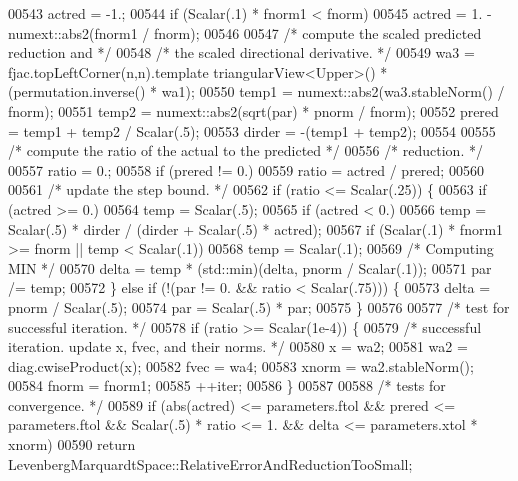 \begin{DoxyCode}
00543         actred = -1.;
00544         \textcolor{keywordflow}{if} (Scalar(.1) * fnorm1 < fnorm)
00545             actred = 1. - numext::abs2(fnorm1 / fnorm);
00546 
00547         \textcolor{comment}{/* compute the scaled predicted reduction and */}
00548         \textcolor{comment}{/* the scaled directional derivative. */}
00549         wa3 = fjac.topLeftCorner(n,n).template triangularView<Upper>() * (permutation.inverse() * wa1);
00550         temp1 = numext::abs2(wa3.stableNorm() / fnorm);
00551         temp2 = numext::abs2(sqrt(par) * pnorm / fnorm);
00552         prered = temp1 + temp2 / Scalar(.5);
00553         dirder = -(temp1 + temp2);
00554 
00555         \textcolor{comment}{/* compute the ratio of the actual to the predicted */}
00556         \textcolor{comment}{/* reduction. */}
00557         ratio = 0.;
00558         \textcolor{keywordflow}{if} (prered != 0.)
00559             ratio = actred / prered;
00560 
00561         \textcolor{comment}{/* update the step bound. */}
00562         \textcolor{keywordflow}{if} (ratio <= Scalar(.25)) \{
00563             \textcolor{keywordflow}{if} (actred >= 0.)
00564                 temp = Scalar(.5);
00565             \textcolor{keywordflow}{if} (actred < 0.)
00566                 temp = Scalar(.5) * dirder / (dirder + Scalar(.5) * actred);
00567             \textcolor{keywordflow}{if} (Scalar(.1) * fnorm1 >= fnorm || temp < Scalar(.1))
00568                 temp = Scalar(.1);
00569             \textcolor{comment}{/* Computing MIN */}
00570             delta = temp * (std::min)(delta, pnorm / Scalar(.1));
00571             par /= temp;
00572         \} \textcolor{keywordflow}{else} \textcolor{keywordflow}{if} (!(par != 0. && ratio < Scalar(.75))) \{
00573             delta = pnorm / Scalar(.5);
00574             par = Scalar(.5) * par;
00575         \}
00576 
00577         \textcolor{comment}{/* test for successful iteration. */}
00578         \textcolor{keywordflow}{if} (ratio >= Scalar(1e-4)) \{
00579             \textcolor{comment}{/* successful iteration. update x, fvec, and their norms. */}
00580             x = wa2;
00581             wa2 = diag.cwiseProduct(x);
00582             fvec = wa4;
00583             xnorm = wa2.stableNorm();
00584             fnorm = fnorm1;
00585             ++iter;
00586         \}
00587 
00588         \textcolor{comment}{/* tests for convergence. */}
00589         \textcolor{keywordflow}{if} (abs(actred) <= parameters.ftol && prered <= parameters.ftol && Scalar(.5) * ratio <= 1. && 
      delta <= parameters.xtol * xnorm)
00590             \textcolor{keywordflow}{return} LevenbergMarquardtSpace::RelativeErrorAndReductionTooSmall;

\end{DoxyCode}
